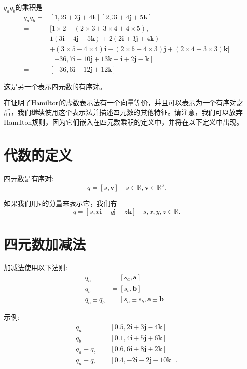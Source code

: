 $q_{a} q_{b}$的乘积是
$$
\begin{aligned}
q_{a} q_{b}= & {[1,2 \mathbf{i}+3 \mathbf{j}+4 \mathbf{k}][2,3 \mathbf{i}+4 \mathbf{j}+5 \mathbf{k}] } \\
= & {[1 \times 2-(2 \times 3+3 \times 4+4 \times 5),} \\
& 1(3 \mathbf{i}+4 \mathbf{j}+5 \mathbf{k})+2(2 \mathbf{i}+3 \mathbf{j}+4 \mathbf{k}) \\
& +(3 \times 5-4 \times 4) \mathbf{i}-(2 \times 5-4 \times 3) \mathbf{j}+(2 \times 4-3 \times 3) \mathbf{k}] \\
= & {[-36,7 \mathbf{i}+10 \mathbf{j}+13 \mathbf{k}-\mathbf{i}+2 \mathbf{j}-\mathbf{k}] } \\
= & {[-36,6 \mathbf{i}+12 \mathbf{j}+12 \mathbf{k}] }
\end{aligned}
$$

这是另一个表示四元数的有序对。

在证明了Hamilton的虚数表示法有一个向量等价，并且可以表示为一个有序对之后，我们继续使用这个表示法并描述四元数的其他特征。请注意，我们可以放弃Hamilton规则，因为它们嵌入在四元数乘积的定义中，并将在以下定义中出现。

\section{代数的定义}
四元数是有序对:
$$
q=[s, \mathbf{v}] \quad s \in \mathbb{R}, \mathbf{v} \in \mathbb{R}^{3} .
$$

如果我们用$\mathbf{v}$的分量来表示它，我们有
$$
q=[s, x \mathbf{i}+y \mathbf{j}+z \mathbf{k}] \quad s, x, y, z \in \mathbb{R} .
$$

\section{四元数加减法}
加减法使用以下法则:
$$
\begin{aligned}
q_{a} & =\left[s_{a}, \mathbf{a}\right] \\
q_{b} & =\left[s_{b}, \mathbf{b}\right] \\
q_{a} \pm q_{b} & =\left[s_{a} \pm s_{b}, \mathbf{a} \pm \mathbf{b}\right]
\end{aligned}
$$

示例:
$$
\begin{aligned}
q_{a} & =[0.5,2 \mathbf{i}+3 \mathbf{j}-4 \mathbf{k}] \\
q_{b} & =[0.1,4 \mathbf{i}+5 \mathbf{j}+6 \mathbf{k}] \\
q_{a}+q_{b} & =[0.6,6 \mathbf{i}+8 \mathbf{j}+2 \mathbf{k}] \\
q_{a}-q_{b} & =[0.4,-2 \mathbf{i}-2 \mathbf{j}-10 \mathbf{k}] .
\end{aligned}
$$

